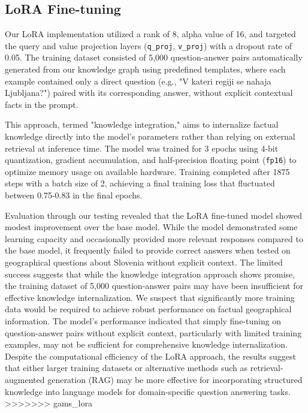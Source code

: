 \documentclass[fleqn,moreauthors,10pt]{ds_report}
\begin{document}
\subsection*{LoRA Fine-tuning}

Our LoRA implementation utilized a rank of 8, alpha value of 16, and targeted the query and value projection layers (\texttt{q\_proj}, \texttt{v\_proj}) with a dropout rate of 0.05. The training dataset consisted of 5,000 question-answer pairs automatically generated from our knowledge graph using predefined templates, where each example contained only a direct question (e.g., "V kateri regiji se nahaja Ljubljana?") paired with its corresponding answer, without explicit contextual facts in the prompt.

This approach, termed "knowledge integration," aims to internalize factual knowledge directly into the model's parameters rather than relying on external retrieval at inference time. The model was trained for 3 epochs using 4-bit quantization, gradient accumulation, and half-precision floating point (\texttt{fp16}) to optimize memory usage on available hardware. Training completed after 1875 steps with a batch size of 2, achieving a final training loss that fluctuated between 0.75-0.83 in the final epochs.

Evaluation through our testing revealed that the LoRA fine-tuned model showed modest improvement over the base model. While the model demonstrated some learning capacity and occasionally provided more relevant responses compared to the base model, it frequently failed to provide correct answers when tested on geographical questions about Slovenia without explicit context. The limited success suggests that while the knowledge integration approach shows promise, the training dataset of 5,000 question-answer pairs may have been insufficient for effective knowledge internalization. We suspect that significantly more training data would be required to achieve robust performance on factual geographical information. The model's performance indicated that simply fine-tuning on question-answer pairs without explicit context, particularly with limited training examples, may not be sufficient for comprehensive knowledge internalization. Despite the computational efficiency of the LoRA approach, the results suggest that either larger training datasets or alternative methods such as retrieval-augmented generation (RAG) may be more effective for incorporating structured knowledge into language models for domain-specific question answering tasks.
>>>>>>> gams_lora



\end{document}

